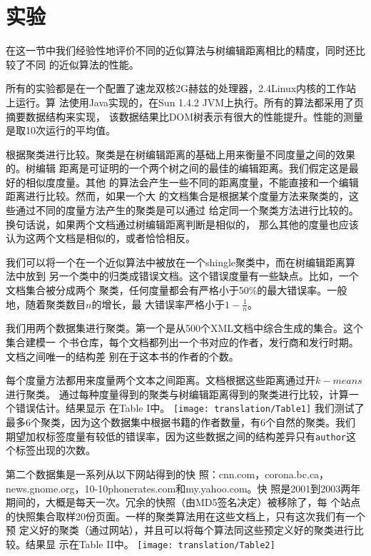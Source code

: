 \section{实验}
在这一节中我们经验性地评价不同的近似算法与树编辑距离相比的精度，同时还比较了不同
的近似算法的性能。

所有的实验都是在一个配置了速龙双核2G赫兹的处理器，2.4Linux内核的工作站上运行。算
法使用Java实现的，在Sun 1.4.2 JVM上执行。所有的算法都采用了页摘要数据结构来实现，
该数据结果比DOM树表示有很大的性能提升。性能的测量是取10次运行的平均值。

根据聚类进行比较。聚类是在树编辑距离的基础上用来衡量不同度量之间的效果的。树编辑
距离是可证明的一个两个树之间的最佳的编辑距离。我们假定这是最好的相似度度量。其他
的算法会产生一些不同的距离度量，不能直接和一个编辑距离进行比较。然而，如果一个大
的文档集合是根据某个度量方法来聚类的，这些通过不同的度量方法产生的聚类是可以通过
给定同一个聚类方法进行比较的。换句话说，如果两个文档通过树编辑距离判断是相似的，
那么其他的度量也应该认为这两个文档是相似的，或者恰恰相反。

我们可以将一个在一个近似算法中被放在一个shingle聚类中，而在树编辑距离算法中放到
另一个类中的归类成错误文档。这个错误度量有一些缺点。比如，一个文档集合被分成两个
聚类，任何度量都会有严格小于50\%的最大错误率。一般地，随着聚类数目$n$的增长，最
大错误率严格小于$1-\frac{1}{n}$。

我们用两个数据集进行聚类。第一个是从500个XML文档中综合生成的集合。这个集合建模一
个书仓库，每个文档都列出一个书对应的作者，发行商和发行时期。文档之间唯一的结构差
别在于这本书的作者的个数。

每个度量方法都用来度量两个文本之间距离。文档根据这些距离通过开$k-means$进行聚类。
通过每种度量得到的聚类与树编辑距离得到的聚类进行比较，计算一个错误估计。结果显示
在Table I中。
{\centering
  \texttt{[image: translation/Table1]}
}
我们测试了最多6个聚类，因为这个数据集中根据书籍的作者数量，有6个自然的聚类。我们
期望加权标签度量有较低的错误率，因为这些数据之间的结构差异只有\texttt{author}这
个标签出现的次数。

第二个数据集是一系列从以下网站得到的快
照：cnn.com，corona.bc.ca，news.gnome.org，10-10phonerates.com和my.yahoo.com。快
照是2001到2003两年期间的，大概是每天一次。冗余的快照（由MD5签名决定）被移除了，每
个站点的快照集合取样20份页面。一样的聚类算法用在这些文档上，只有这次我们有一个预
定义好的聚类（通过网站），并且可以将每个算法同这些预定义好的聚类进行比较。结果显
示在Table II中。{\centering
\texttt{[image: translation/Table2]}
}

